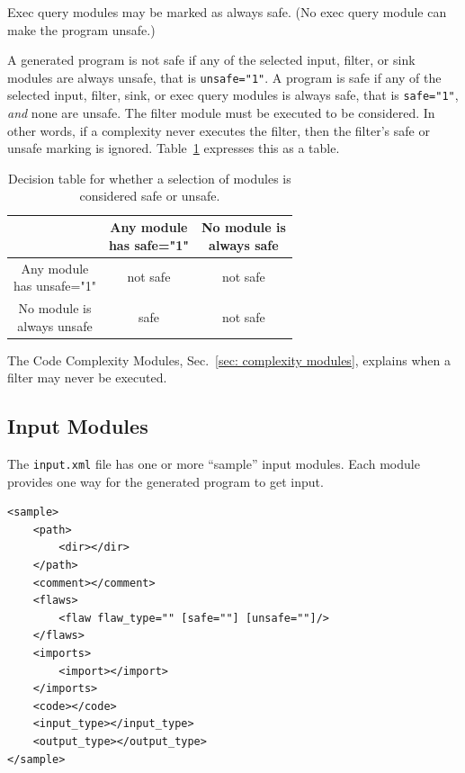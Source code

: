 \documentclass[12pt]{article}
\begin{document}
Exec query modules may be marked as always safe.  (No exec query module can make the
program unsafe.)

A generated program is not safe if any of the selected input, filter, or sink modules
are always unsafe, that is \verb|unsafe="1"|.  A program is safe if any of the
selected input, filter, sink, or exec query modules is always safe, that is
\verb|safe="1"|, \emph{and} none
are unsafe.  The filter module must be executed to be considered.  In other words, if
a complexity never executes the filter, then the filter's safe or unsafe marking is
ignored.  Table~\ref{tab:selection safe algorithm} expresses this as a table.

\begin{table}[H]
\centering
\begin{tabular}{c|c|c|}
  & \makecell{Any module \\ has safe="1"}
  & \makecell{No module is \\ always safe} \\
\hline
\makecell{Any module \\ has unsafe="1"}  & not safe & not safe \\
\hline
\makecell{No module is \\ always unsafe} &   safe   & not safe \\
\hline
\end{tabular}
\caption{Decision table for whether a selection of modules is considered safe or unsafe.}
\label{tab:selection safe algorithm}
\end{table}

The Code Complexity Modules, Sec.~\ref{sec: complexity modules}, explains when a
filter may never be executed.


\subsection{Input Modules}
\label{sec: input module}

The \verb|input.xml| file has one or more ``sample'' input modules.  Each module
provides one way for the generated program to get input.

\begin{verbatim}
<sample>
    <path>
        <dir></dir>
    </path>
    <comment></comment>
    <flaws>
        <flaw flaw_type="" [safe=""] [unsafe=""]/>
    </flaws>
    <imports>
        <import></import>
    </imports>
    <code></code>
    <input_type></input_type>
    <output_type></output_type>
</sample>
\end{verbatim}
\end{document}
